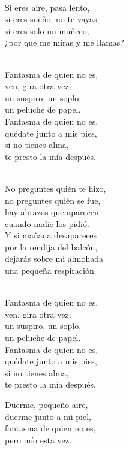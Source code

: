 \begin{lyrics}
\\
Si eres aire, pasa lento,\\
si eres sueño, no te vayas,\\
si eres solo un muñeco,\\
¿por qué me miras y me llamas?

\\
Fantasma de quien no es,\\
ven, gira otra vez,\\
un suspiro, un soplo,\\
un peluche de papel.\\
Fantasma de quien no es,\\
quédate junto a mis pies,\\
si no tienes alma,\\
te presto la mía después.

\\
No preguntes quién te hizo,\\
no preguntes quién se fue,\\
hay abrazos que aparecen\\
cuando nadie los pidió.\\
Y si mañana desapareces\\
por la rendija del balcón,\\
dejarás sobre mi almohada\\
una pequeña respiración.

\\
Fantasma de quien no es,\\
ven, gira otra vez,\\
un suspiro, un soplo,\\
un peluche de papel.\\
Fantasma de quien no es,\\
quédate junto a mis pies,\\
si no tienes alma,\\
te presto la mía después.

Duerme, pequeño aire,\\
duerme junto a mi piel,\\
fantasma de quien no es,\\
pero mío esta vez.
\end{lyrics}

